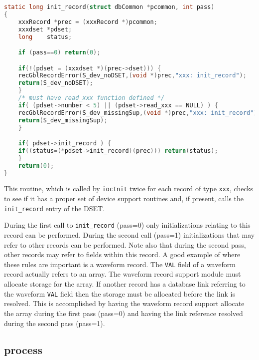 \begin{lstlisting}[language=C]
static long init_record(struct dbCommon *pcommon, int pass)
{
    xxxRecord *prec = (xxxRecord *)pcommon;
    xxxdset	*pdset;
    long	status;

    if (pass==0) return(0);

    if(!(pdset = (xxxdset *)(prec->dset))) {
	recGblRecordError(S_dev_noDSET,(void *)prec,"xxx: init_record");
	return(S_dev_noDSET);
    }
    /* must have read_xxx function defined */
    if( (pdset->number < 5) || (pdset->read_xxx == NULL) ) {
	recGblRecordError(S_dev_missingSup,(void *)prec,"xxx: init_record");
	return(S_dev_missingSup);
    }

    if( pdset->init_record ) {
	if((status=(*pdset->init_record)(prec))) return(status);
    }
    return(0);
}
\end{lstlisting}

This routine, which is called by \verb|iocInit| twice for each record of type \verb|xxx|, checks to see if it has a proper set of device support routines and, if present, calls the \verb|init_record| entry of the DSET.

During the first call to \verb|init_record| (pass=0) only initializations relating to this record can be performed.
During the second call (pass=1) initializations that may refer to other records can be performed.
Note also that during the second pass, other records may refer to fields within this record.
A good example of where these rules are important is a waveform record.
The \verb|VAL| field of a waveform record actually refers to an array.
The waveform record support module must allocate storage for the array.
If another record has a database link referring to the waveform \verb|VAL| field then the storage must be allocated before the link is resolved.
This is accomplished by having the waveform record support allocate the array during the first pass (pass=0) and having the link reference resolved during the second pass (pass=1).

\subsection{process}

